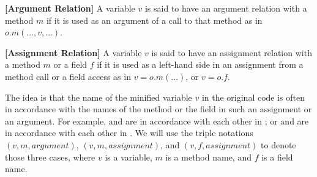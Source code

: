 
\begin{definition}{\bf [Argument Relation]}
  A variable $v$ is said to have an argument relation with a method
  $m$ if it is used as an argument of a call to that method as in
  $o.m(...,v,...)$.
\end{definition}

\begin{definition}{\bf [Assignment Relation]}
  A variable $v$ is said to have an assignment relation with a method
  $m$ or a field $f$ if it is used as a left-hand side in an
  assignment from a method call or a field access as in $v =
  o.m(...)$, or $v = o.f$.
\end{definition}


%
%

The idea is that the name of the minified variable $v$ in the original
code is often in accordance with the names of the method or the field
in such an assignment or an argument. For example,  and
 are in accordance with each other in ; or  and
 are in accordance with each other in
.  We will use the
triple notations $(v, m, argument)$, $(v, m, assignment)$, and
$(v, f, assignment)$ to denote those three cases, where $v$ is a
variable, $m$ is a method name, and $f$ is a field name.




